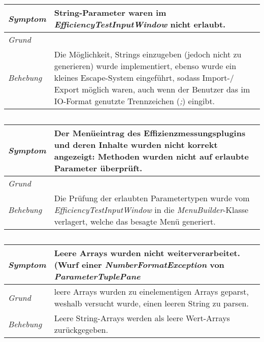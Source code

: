 \documentclass[a4paper]{report}
\begin{document}
\subsection{}
\begin{tabular}{p{2.5cm}  p{11.5cm}}
  \hline
  \textit{Symptom} & String-Parameter waren im \emph{EfficiencyTestInputWindow} nicht erlaubt. \\
  \hline
  \textit{Grund}  \\
  \hline
  \textit{Behebung} & Die Möglichkeit, Strings einzugeben (jedoch nicht zu generieren) wurde implementiert, ebenso wurde ein kleines Escape-System eingeführt, sodass Import-/ Export möglich waren, auch wenn der Benutzer das im IO-Format genutzte Trennzeichen (\emph{;}) eingibt. \\
  \hline
\end{tabular}

\subsection{}
\begin{tabular}{p{2.5cm}  p{11.5cm}}
  \hline
  \textit{Symptom} & Der Menüeintrag des Effizienzmessungsplugins und deren Inhalte wurden nicht korrekt angezeigt: Methoden wurden nicht auf erlaubte Parameter überprüft. \\
  \hline
  \textit{Grund}  \\
  \hline
  \textit{Behebung} & Die Prüfung der erlaubten Parametertypen wurde vom \emph{EfficiencyTestInputWindow} in die \emph{MenuBuilder}-Klasse verlagert, welche das besagte Menü generiert. \\
  \hline
\end{tabular}

\subsection{}
\begin{tabular}{p{2.5cm}  p{11.5cm}}
  \hline
  \textit{Symptom} & Leere Arrays wurden nicht weiterverarbeitet. (Wurf einer \emph{NumberFormatException} von \emph{ParameterTuplePane}  \\
  \hline
  \textit{Grund} & leere Arrays wurden zu einelementigen Arrays geparst, weshalb versucht wurde, einen leeren String zu parsen. \\
  \hline
  \textit{Behebung} & Leere String-Arrays werden als leere Wert-Arrays zurückgegeben. \\
  \hline
\end{tabular}
\end{document}
